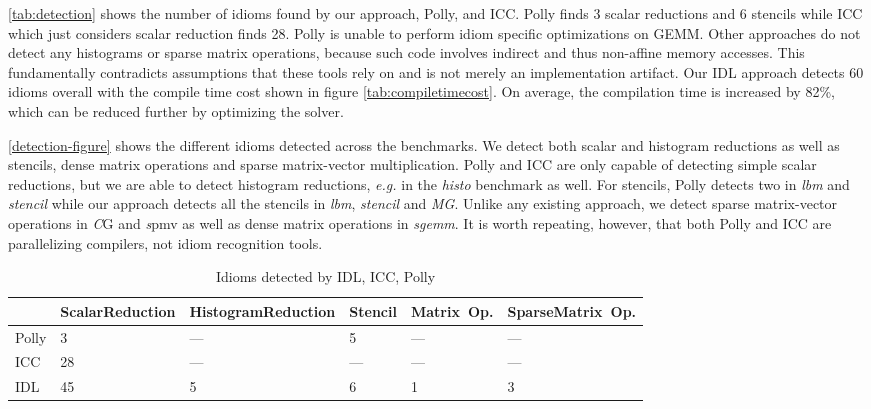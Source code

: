     \autoref{tab:detection} shows the number of idioms found by our approach, Polly, and ICC.
    Polly finds 3 scalar reductions and 6 stencils while ICC which just considers  scalar reduction finds 28.
    Polly is unable to perform idiom specific optimizations on GEMM.
    Other approaches do not detect any histograms or sparse matrix operations, because such code involves indirect and thus non-affine memory accesses.
    This fundamentally contradicts assumptions that these tools rely on and is not merely an implementation artifact.
    Our IDL approach detects 60 idioms overall with the compile time cost shown in figure \autoref{tab:compiletimecost}.
    On average, the compilation time is increased by 82\%, which can be reduced further by optimizing the solver.

    \autoref{detection-figure} shows the different idioms detected across
    the  benchmarks. We detect both scalar
    and histogram reductions as well as stencils, dense matrix operations
    and sparse matrix-vector multiplication.
    Polly and ICC are only capable of detecting simple scalar
    reductions, but we are able to detect histogram reductions, {\em e.g.} in
    the \emph{histo} benchmark as well.  For stencils, Polly detects two
    in \emph{lbm} and \emph{stencil} while our approach
    detects all the stencils in \emph{lbm}, \emph{stencil} and \emph{MG}.
    Unlike any existing approach, we detect sparse matrix-vector
    operations in {\emph CG} and {\emph spmv} as well as dense matrix
    operations in \emph{sgemm}. It is worth repeating, however, that both
    Polly and ICC are parallelizing compilers, not idiom recognition
    tools.

\begin{table}[t]
\centering
  \footnotesize
  \begin{tabular}{lP{2.16cm}P{2.16cm}P{2.16cm}P{2.163cm}P{2.163cm}}
  \toprule
  & Scalar\newline{}Reduction & Histogram\newline{}Reduction & Stencil & Matrix~Op. & Sparse\newline{}Matrix~Op.\\
  \midrule
  Polly &  3  &  --- &   5  &  --- & --- \\[0.25em]
  ICC   &  28 &  --- &  --- &  --- & --- \\[0.25em]
  IDL   &  45 &   5  &   6  &   1  &  3  \\
  \bottomrule
\end{tabular}

  \vspace{.1cm}
\caption{Idioms detected by IDL, ICC, Polly}
\label{tab:detection}
\vspace{-1em}
\end{table}

